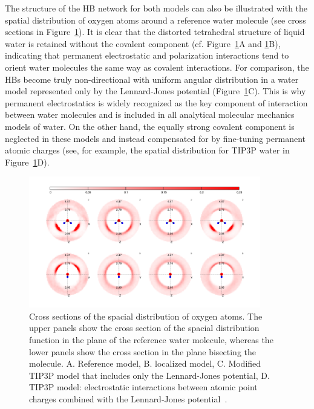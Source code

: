 \documentclass[journal=jacsat,manuscript=article]{achemso}
\begin{document}
The structure of the HB network for both models can also be illustrated with the spatial distribution of oxygen atoms around a reference water molecule (see cross sections in Figure~\ref{Fig:SDF}). 
It is clear that the distorted tetrahedral structure of liquid water is retained without the covalent component (cf. Figure~\ref{Fig:SDF}A and \ref{Fig:SDF}B), indicating that permanent electrostatic and polarization interactions tend to orient water molecules the same way as covalent interactions. 
For comparison, the HBs become truly non-directional with uniform angular distribution in a water model represented only by the Lennard-Jones potential (Figure~\ref{Fig:SDF}C). %
This is why permanent electrostatics is widely recognized as the key component of interaction between water molecules and is included in all analytical molecular mechanics models of water. 
On the other hand, the equally strong covalent component is neglected in these models and instead compensated for by fine-tuning permanent atomic charges (see, for example, the spatial distribution for TIP3P water in Figure~\ref{Fig:SDF}D). 

\begin{figure}
\includegraphics[width=0.9\textwidth]{SDF}
\caption{Cross sections of the spacial distribution of oxygen atoms. 
The upper panels show the cross section of the spacial distribution function in the plane of the reference water molecule, whereas the lower panels show the cross section in the plane bisecting the molecule. 
A. Reference model, B. localized model, C. Modified TIP3P model that includes only the Lennard-Jones potential, D. TIP3P model: electrostatic interactions between atomic point charges combined with the Lennard-Jones potential~\cite{TIP3P}.} \label{Fig:SDF}
\end{figure}
\end{document}
